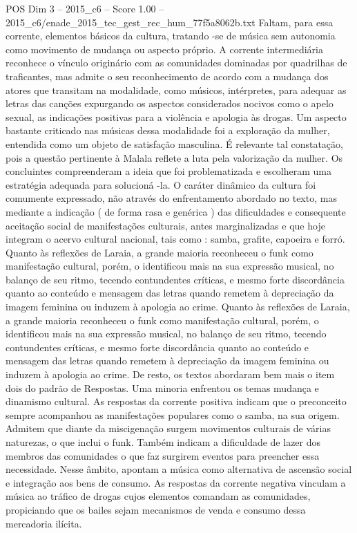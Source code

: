\begin{textsample}{POS Dim 3 – 2015\_c6 – Score 1.00 – 2015\_c6/enade\_2015\_tec\_gest\_rec\_hum\_77f5a8062b.txt}
Faltam, para essa corrente, elementos básicos da cultura, tratando -se de música sem autonomia como movimento de mudança ou aspecto próprio.
A corrente intermediária reconhece o vínculo originário com as comunidades dominadas por quadrilhas de traficantes, mas admite o seu reconhecimento de acordo com a mudança dos atores que transitam na modalidade, como músicos, intérpretes, para adequar as letras das canções expurgando os aspectos considerados nocivos como o apelo sexual, as indicações positivas para a violência e apologia às drogas.
Um aspecto bastante criticado nas músicas dessa modalidade foi a exploração da mulher, entendida como um objeto de satisfação masculina.
É relevante tal constatação, pois a questão pertinente à Malala reflete a luta pela valorização da mulher.
Os concluintes compreenderam a ideia que foi problematizada e escolheram uma estratégia adequada para solucioná -la.
O caráter dinâmico da cultura foi comumente expressado, não através do enfrentamento abordado no texto, mas mediante a indicação ( de forma rasa e genérica ) das dificuldades e consequente aceitação social de manifestações culturais, antes marginalizadas e que hoje integram o acervo cultural nacional, tais como : samba, grafite, capoeira e forró.
Quanto às reflexões de Laraia, a grande maioria reconheceu o funk como manifestação cultural, porém, o identificou mais na sua expressão musical, no balanço de seu ritmo, tecendo contundentes críticas, e mesmo forte discordância quanto ao conteúdo e mensagem das letras quando remetem à depreciação da imagem feminina ou induzem à apologia ao crime.
Quanto às reflexões de Laraia, a grande maioria reconheceu o funk como manifestação cultural, porém, o identificou mais na sua expressão musical, no balanço de seu ritmo, tecendo contundentes críticas, e mesmo forte discordância quanto ao conteúdo e mensagem das letras quando remetem à depreciação da imagem feminina ou induzem à apologia ao crime.
De resto, os textos abordaram bem mais o item dois do padrão de Respostas.
Uma minoria enfrentou os temas mudança e dinamismo cultural.
As respostas da corrente positiva indicam que o preconceito sempre acompanhou as manifestações populares como o samba, na sua origem.
Admitem que diante da miscigenação surgem movimentos culturais de várias naturezas, o que inclui o funk.
Também indicam a dificuldade de lazer dos membros das comunidades o que faz surgirem eventos para preencher essa necessidade.
Nesse âmbito, apontam a música como alternativa de ascensão social e integração aos bens de consumo.
As respostas da corrente negativa vinculam a música ao tráfico de drogas cujos elementos comandam as comunidades, propiciando que os bailes sejam mecanismos de venda e consumo dessa mercadoria ilícita.

\end{textsample}
